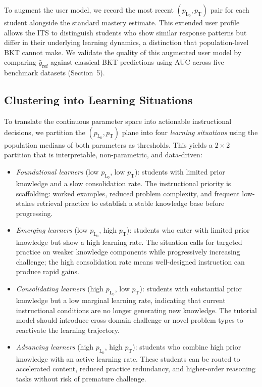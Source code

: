 \documentclass[runningheads]{llncs}
\begin{document}
To augment the user model, we record the most recent $(p_{\text{L}_0}, p_{\text{T}})$ pair for each student alongside the standard mastery estimate. This extended user profile allows the ITS to distinguish students who show similar response patterns but differ in their underlying learning dynamics, a distinction that population-level BKT cannot make. We validate the quality of this augmented user model by comparing $\hat{y}_{\text{ref}}$ against classical BKT predictions using AUC across five benchmark datasets (Section~5).

\subsection{Clustering into Learning Situations}

To translate the continuous parameter space into actionable instructional decisions, we partition the $(p_{\text{L}_0}, p_{\text{T}})$ plane into four \textit{learning situations} using the population medians of both parameters as thresholds. This yields a $2 \times 2$ partition that is interpretable, non-parametric, and data-driven:

\begin{itemize}
    \item \textit{Foundational learners} (low $p_{\text{L}_0}$, low $p_{\text{T}}$): students with limited prior knowledge and a slow consolidation rate. The instructional priority is scaffolding: worked examples, reduced problem complexity, and frequent low-stakes retrieval practice to establish a stable knowledge base before progressing.
    \item \textit{Emerging learners} (low $p_{\text{L}_0}$, high $p_{\text{T}}$): students who enter with limited prior knowledge but show a high learning rate. The situation calls for targeted practice on weaker knowledge components while progressively increasing challenge; the high consolidation rate means well-designed instruction can produce rapid gains.
    \item \textit{Consolidating learners} (high $p_{\text{L}_0}$, low $p_{\text{T}}$): students with substantial prior knowledge but a low marginal learning rate, indicating that current instructional conditions are no longer generating new knowledge. The tutorial model should introduce cross-domain challenge or novel problem types to reactivate the learning trajectory.
    \item \textit{Advancing learners} (high $p_{\text{L}_0}$, high $p_{\text{T}}$): students who combine high prior knowledge with an active learning rate. These students can be routed to accelerated content, reduced practice redundancy, and higher-order reasoning tasks without risk of premature challenge.
\end{itemize}
\end{document}
